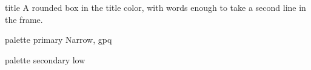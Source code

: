 \documentclass{beamer}
\begin{document}
\begin{frame}
\begin{beamercolorbox}[rounded=true,shadow=true,sep=4pt]{title}
A rounded box in the title color, with words enough to take a second line in the frame.
\end{beamercolorbox}
\begin{beamercolorbox}[rounded=true,shadow,wd=5cm,colsep=2pt]{palette primary}
Narrow, gpq
\end{beamercolorbox}
\begin{beamercolorbox}[rounded=true,shadow=true,wd=3cm,ht=2pt,dp=1pt]{palette secondary}
low
\end{beamercolorbox}
\end{frame}
\end{document}
